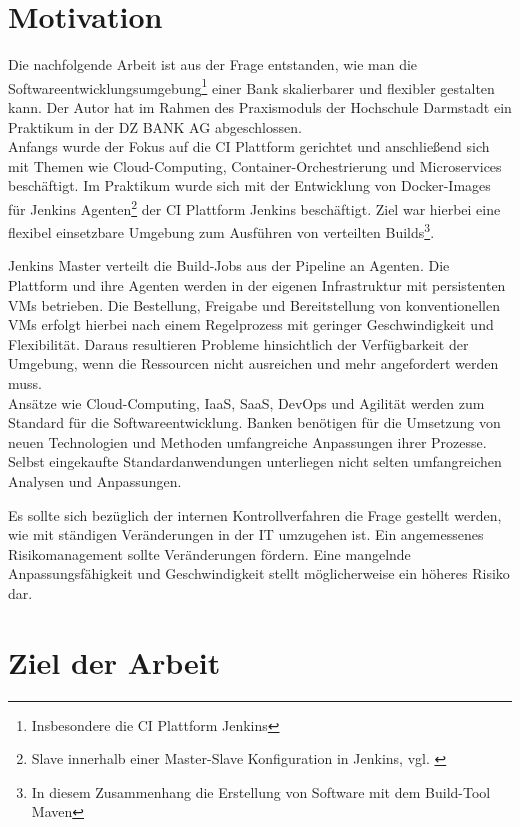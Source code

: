 \section{Motivation}
\label{sec:intro:motivation}

Die nachfolgende Arbeit ist aus der Frage entstanden, wie man die Softwareentwicklungsumgebung\footnote{Insbesondere die CI Plattform Jenkins} einer Bank skalierbarer und flexibler gestalten kann. Der Autor hat im Rahmen des Praxismoduls der Hochschule Darmstadt ein Praktikum in der DZ BANK AG abgeschlossen.
\medskip
\\
Anfangs wurde der Fokus auf die \ac{CI} Plattform gerichtet und anschließend sich mit Themen wie Cloud-Computing, Container-Orchestrierung und Microservices beschäftigt. Im Praktikum wurde sich mit der Entwicklung von Docker-Images für Jenkins Agenten\footnote{Slave innerhalb einer Master-Slave Konfiguration in Jenkins, vgl. \cite{Pathania2017}} der \ac{CI} Plattform Jenkins beschäftigt. Ziel war hierbei eine flexibel einsetzbare Umgebung zum Ausführen von verteilten Builds\footnote{In diesem Zusammenhang die Erstellung von Software mit dem Build-Tool Maven}.

Jenkins Master verteilt die Build-Jobs aus der Pipeline an Agenten. Die Plattform und ihre Agenten werden in der eigenen Infrastruktur mit persistenten \ac{VMs} betrieben. Die Bestellung, Freigabe und Bereitstellung von konventionellen \ac{VMs} erfolgt hierbei nach einem Regelprozess\cite{MaRisk:2017} mit geringer Geschwindigkeit und Flexibilität. Daraus resultieren Probleme hinsichtlich der Verfügbarkeit der Umgebung, wenn die Ressourcen nicht ausreichen und mehr angefordert werden muss.
\medskip
\\
Ansätze wie Cloud-Computing, \ac{IaaS}, \ac{SaaS}, DevOps und Agilität werden zum Standard für die Softwareentwicklung. Banken benötigen für die Umsetzung von neuen Technologien und Methoden umfangreiche Anpassungen ihrer Prozesse. Selbst eingekaufte Standardanwendungen unterliegen nicht selten umfangreichen Analysen und Anpassungen. 

Es sollte sich bezüglich der internen Kontrollverfahren die Frage gestellt werden, wie mit ständigen Veränderungen in der IT umzugehen ist. Ein angemessenes Risikomanagement sollte Veränderungen fördern. Eine mangelnde Anpassungsfähigkeit und Geschwindigkeit stellt möglicherweise ein höheres Risiko dar.
%
%
\section{Ziel der Arbeit}
\label{sec:intro:goal}

